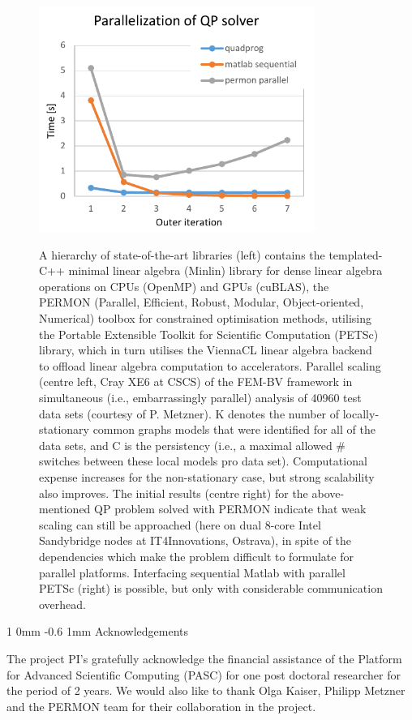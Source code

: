 \documentclass[a0,portrait]{a0poster}
\makeatletter
\renewcommand{\section}{\@startsection
        {section}%
        {1}%
        {0mm}%
        {-0.6\baselineskip}%
        {1mm}%
        {\Large\color{NTNUBlue}\bfseries}}%
\makeatother
\begin{document}
\begin{multicols}{2}
\begin{figure}[H]
\begin{center}
{\includegraphics[width=9cm]{ParallelQP.pdf}}
 \caption{A hierarchy of state-of-the-art libraries (left) contains the templated-C++ minimal linear algebra (Minlin) library for dense linear algebra operations on CPUs (OpenMP) and GPUs (cuBLAS), the PERMON (Parallel, Efficient, Robust, Modular, Object-oriented, Numerical) toolbox for constrained optimisation methods, utilising the Portable Extensible Toolkit for Scientific Computation (PETSc) library, which in turn utilises the ViennaCL linear algebra backend  to offload linear algebra computation to accelerators. Parallel scaling (centre left, Cray XE6 at CSCS) of the FEM-BV framework in simultaneous (i.e., embarrassingly parallel) analysis of 40960 test data sets (courtesy of P. Metzner). K denotes the number of locally-stationary common graphs models that were identified for all of the data sets, and C is the persistency (i.e., a maximal allowed \# switches between these local models pro data set). Computational expense increases for the non-stationary case, but strong scalability also improves.   The initial results (centre right) for the above-mentioned QP problem solved with PERMON indicate that weak scaling can still be approached (here on dual 8-core Intel Sandybridge nodes at IT4Innovations, Ostrava), in spite of the dependencies which make the problem difficult to formulate for parallel platforms. Interfacing sequential Matlab with parallel PETSc (right) is possible, but only with considerable communication overhead. }
 \end{center} \label{fig:Scaling}
\end{figure}

\vspace{-1.0cm}
%
\section{Acknowledgements}
\noindent
\par  The project PI's gratefully acknowledge the financial assistance of the Platform for Advanced Scientific Computing (PASC) for one post doctoral researcher for the period of 2 years. We would also like to thank Olga Kaiser, Philipp Metzner and the PERMON team for their collaboration in the project.


\end{multicols}
\end{document}
